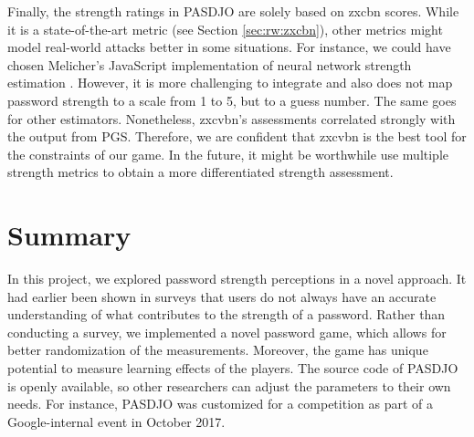 Finally, the strength ratings in PASDJO are solely based on zxcbn scores. While it is a state-of-the-art metric (see Section \ref{sec:rw:zxcbn}), other metrics might model real-world attacks better in some situations. For instance, we could have chosen Melicher's JavaScript implementation of neural network strength estimation \cite{Melicher2016NeuralNetworks}. However, it is more challenging to integrate and also does not map password strength to a scale from 1 to 5, but to a guess number. The same goes for other estimators. Nonetheless, zxcvbn's assessments correlated strongly with the output from \gls{PGS}. Therefore, we are confident that zxcvbn is the best tool for the constraints of our game. In the future, it might be worthwhile use multiple strength metrics to obtain a more differentiated strength assessment.

\section{Summary}
In this project, we explored password strength perceptions in a novel approach. It had earlier been shown in surveys that users do not always have an accurate understanding of what contributes to the strength of a password. Rather than conducting a survey, we implemented a novel password game, which allows for better randomization of the measurements. Moreover, the game has unique potential to measure learning effects of the players. The source code of PASDJO is openly available, so other researchers can adjust the parameters to their own needs. For instance, PASDJO was customized for a competition as part of a Google-internal event in October 2017. 


